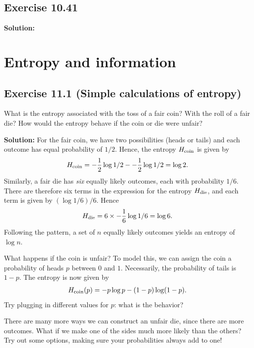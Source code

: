 \documentclass{book}
\begin{document}
\section*{Exercise 10.41}
    

    \textbf{Solution:}
    
\chapter{Entropy and information}

\section*{Exercise 11.1 (Simple calculations of entropy)}
    What is the entropy associated with the toss of a fair coin? With the roll of a fair die? How would the entropy behave if the coin or die were unfair?
    
    \textbf{Solution:} For the fair coin, we have two possibilities (heads or tails) and each outcome has equal probability of $1/2$. Hence, the entropy $H_{\rm{coin}}$ is given by
    \begin{align}
        H_{\rm{coin}} = -\frac{1}{2}\log1/2--\frac{1}{2}\log1/2 = \log 2.
    \end{align}
    Similarly, a fair die has \emph{six} equally likely outcomes, each with probability $1/6$. There are therefore six terms in the expression for the entropy $H_{\rm{die}}$, and each term is given by $(\log 1/6)/6$. Hence
    \begin{align}
        H_{\rm{die}} = 6 \times -\frac{1}{6}\log 1/6 = \log 6.
    \end{align}
    Following the pattern, a set of $n$ equally likely outcomes yields an entropy of $\log n$. 
    
    What happens if the coin is unfair? To model this, we can assign the coin a probability of heads $p$ between $0$ and $1$. Necessarily, the probability of tails is $1-p$. The entropy is now given by
    \begin{align}
        H_{\rm{coin}} (p) = -p\log p - (1-p) \log (1-p).
    \end{align}
    Try plugging in different values for $p$: what is the behavior? 
    
    There are many more ways we can construct an unfair die, since there are more outcomes. What if we make one of the sides much more likely than the others? Try out some options, making sure your probabilities always add to one!
\end{document}
